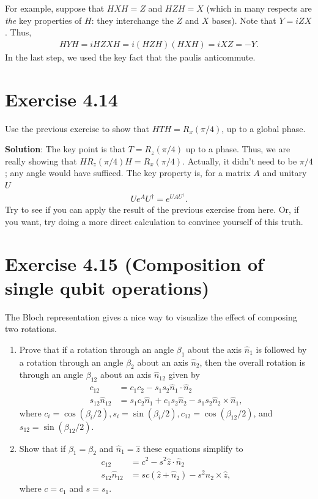 \documentclass{book}
\begin{document}
    For example, suppose that $HXH = Z$ and $HZH = X$ (which in many respects are \emph{the} key properties of $H$: they interchange the $Z$ and $X$ bases). Note that $Y = i Z X$. Thus,
    \begin{align}
        HYH = i HZXH = i (HZH)(HXH) = i XZ = -Y.
    \end{align}
    In the last step, we used the key fact that the paulis anticommute. 

\section*{Exercise 4.14}
    Use the previous exercise to show that $HTH = R_x(\pi/4)$, up to a global phase.

    \textbf{Solution}: The key point is that $T = R_z(\pi/4)$ up to a phase. Thus, we are really showing that $H R_z (\pi/4) H = R_x(\pi/4)$. Actually, it didn't need to be $\pi/4$; any angle would have sufficed. The key property is, for a matrix $A$ and unitary $U$
    \begin{align}
        U e^{A} U^\dagger = e^{U A U^\dagger}.
    \end{align}
    Try to see if you can apply the result of the previous exercise from here. Or, if you want, try doing a more direct calculation to convince yourself of this truth. 

\section*{Exercise 4.15 (Composition of single qubit operations)}
    The Bloch representation gives a nice way to visualize the effect of composing two rotations.
    \begin{enumerate}
        \item Prove that if a rotation through an angle $\beta_1$ about the axis $\hat{n}_1$ is followed by a rotation through an angle $\beta_2$ about an axis $\hat{n}_2$, then the overall rotation is through an angle $\beta_{12}$ about an axis $\hat{n}_{12}$ given by
        \begin{align}
            c_{12} &= c_1 c_2 - s_1 s_2 \hat{n}_1 \cdot \hat{n}_2 \\
            s_{12} \hat{n}_{12} &= s_1 c_2 \hat{n}_1 + c_1 s_2 \hat{n}_2 - s_1 s_2 \hat{n}_2 \times \hat{n}_1,
        \end{align}
        where $c_i = \cos(\beta_i/2), s_i = \sin(\beta_i/2), c_{12} = \cos(\beta_{12}/2)$, and $s_{12} = \sin(\beta_{12}/2)$.
        \item Show that if $\beta_1 = \beta_2$ and $\hat{n}_1 = \hat{z}$ these equations simplify to
        \begin{align}
            c_{12} &= c^2 - s^2 \hat{z}\cdot \hat{n}_2 \\
            s_{12} \hat{n}_{12} &= sc(\hat{z} + \hat{n}_2) - s^2 \hat{n}_2 \times \hat{z},
        \end{align}
        where $c = c_1$ and $s = s_1$.
    \end{enumerate}
\end{document}
